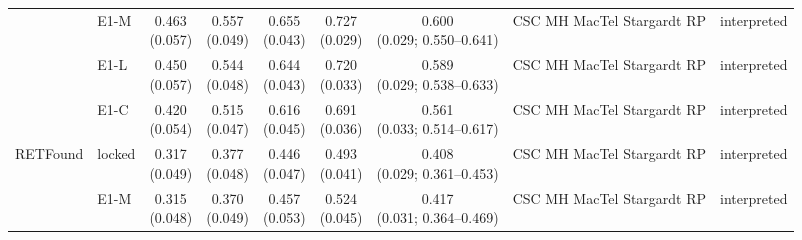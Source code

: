 \begin{longtable}{@{}p{3.2cm}lcccccp{2.4cm}p{2.2cm}@{}}
 & E1-M & \makecell{0.463\\{\scriptsize (0.057)}} & \makecell{0.557\\{\scriptsize (0.049)}} & \makecell{0.655\\{\scriptsize (0.043)}} & \makecell{0.727\\{\scriptsize (0.029)}} & \makecell{0.600\\{\scriptsize (0.029; 0.550--0.641)}} & CSC MH MacTel Stargardt RP & interpreted \\
 & E1-L & \makecell{0.450\\{\scriptsize (0.057)}} & \makecell{0.544\\{\scriptsize (0.048)}} & \makecell{0.644\\{\scriptsize (0.043)}} & \makecell{0.720\\{\scriptsize (0.033)}} & \makecell{0.589\\{\scriptsize (0.029; 0.538--0.633)}} & CSC MH MacTel Stargardt RP & interpreted \\
 & E1-C & \makecell{0.420\\{\scriptsize (0.054)}} & \makecell{0.515\\{\scriptsize (0.047)}} & \makecell{0.616\\{\scriptsize (0.045)}} & \makecell{0.691\\{\scriptsize (0.036)}} & \makecell{0.561\\{\scriptsize (0.033; 0.514--0.617)}} & CSC MH MacTel Stargardt RP & interpreted \\
\addlinespace[2pt]
RETFound & locked & \makecell{0.317\\{\scriptsize (0.049)}} & \makecell{0.377\\{\scriptsize (0.048)}} & \makecell{0.446\\{\scriptsize (0.047)}} & \makecell{0.493\\{\scriptsize (0.041)}} & \makecell{0.408\\{\scriptsize (0.029; 0.361--0.453)}} & CSC MH MacTel Stargardt RP & interpreted \\
 & E1-M & \makecell{0.315\\{\scriptsize (0.048)}} & \makecell{0.370\\{\scriptsize (0.049)}} & \makecell{0.457\\{\scriptsize (0.053)}} & \makecell{0.524\\{\scriptsize (0.045)}} & \makecell{0.417\\{\scriptsize (0.031; 0.364--0.469)}} & CSC MH MacTel Stargardt RP & interpreted \\

\end{longtable}
